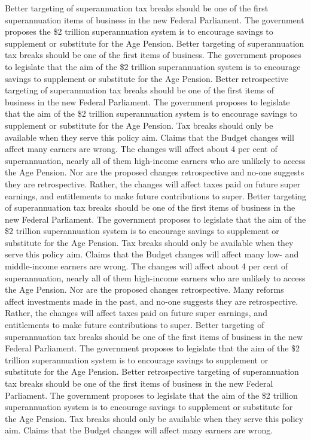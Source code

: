 \documentclass{article}
\begin{document}
Better targeting of superannuation tax breaks should be one of the first superannuation items of business in the new Federal Parliament.
The government proposes the \$2 trillion superannuation system is to encourage savings to supplement or substitute for the Age Pension.
Better targeting of superannuation tax breaks should be one of the first items of business.
The government proposes to legislate that the aim of the \$2 trillion superannuation system is to encourage savings to supplement or substitute for the Age Pension.
Better retrospective targeting of superannuation tax breaks should be one of the first items of business in the new Federal Parliament.
The government proposes to legislate that the aim of the \$2 trillion superannuation system is to encourage savings to supplement or substitute for the Age Pension.
Tax breaks should only be available when they serve this policy aim.
Claims that the Budget changes will affect many earners are wrong.
The changes will affect about 4 per cent of superannuation, nearly all of them high-income earners who are unlikely to access the Age Pension. 
Nor are the proposed changes retrospective and no-one suggests they are retrospective.
Rather, the changes will affect taxes paid on future super earnings, and entitlements to make future contributions to super. 
Better targeting of superannuation tax breaks should be one of the first items of business in the new Federal Parliament.
The government proposes to legislate that the aim of the \$2 trillion superannuation system is to encourage savings to supplement or substitute for the Age Pension.
Tax breaks should only be available when they serve this policy aim.
Claims that the Budget changes will affect many low- and middle-income earners are wrong.
The changes will affect about 4 per cent of superannuation, nearly all of them high-income earners who are unlikely to access the Age Pension. 
Nor are the proposed changes retrospective.
Many reforms affect investments made in the past, and no-one suggests they are retrospective.
Rather, the changes will affect taxes paid on future super earnings, and entitlements to make future contributions to super. 
Better targeting of superannuation tax breaks should be one of the first items of business in the new Federal Parliament.
The government proposes to legislate that the aim of the \$2 trillion superannuation system is to encourage savings to supplement or substitute for the Age Pension.
Better retrospective targeting of superannuation tax breaks should be one of the first items of business in the new Federal Parliament.
The government proposes to legislate that the aim of the \$2 trillion superannuation system is to encourage savings to supplement or substitute for the Age Pension.
Tax breaks should only be available when they serve this policy aim.
Claims that the Budget changes will affect many earners are wrong.
\end{document}
